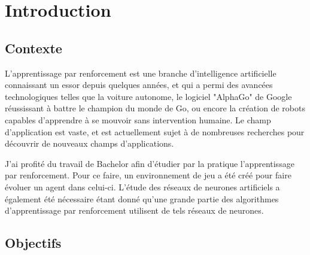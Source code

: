 \documentclass[11pt,a4paper]{report}
\title{\vartitle}
\author{\varauthor}
\date{\vardate}
\begin{document}
  \begin{titlepage}
    \maketitle

    \thispagestyle{empty}

    \begin{abstract}
    // TODO
    \end{abstract}


  \end{titlepage}
  
  \newpage
  
  \tableofcontents
  
  \newpage

  \chapter{Introduction}
  
  \section{Contexte}
  
  \par L'apprentissage par renforcement est une branche d'intelligence artificielle connaissant un essor depuis quelques années, et qui a permi des avancées technologiques telles que la voiture autonome, le logiciel "AlphaGo" de Google réussissant à battre le champion du monde de Go, ou encore la création de robots capables d'apprendre à se mouvoir sans intervention humaine. Le champ d'application est vaste, et est actuellement sujet à de nombreuses recherches pour découvrir de nouveaux champs d'applications. 
  
  \par J'ai profité du travail de Bachelor afin d'étudier par la pratique l'apprentissage par renforcement. Pour ce faire, un environnement de jeu a été créé pour faire évoluer un agent dans celui-ci. L'étude des réseaux de neurones artificiels a également été nécessaire étant donné qu'une grande partie des algorithmes d'apprentissage par renforcement utilisent de tels réseaux de neurones. 
  
  \section{Objectifs}
  
\end{document}
